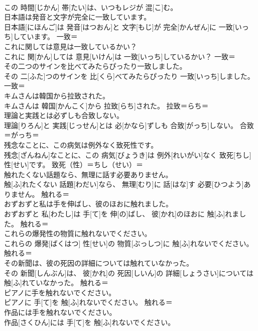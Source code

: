 \documentclass[8pt]{extreport}
\begin{document}
\begin{CJK}{UTF8}{min}
\\	この 時間[じかん] 帯[たい]は、いつもレジが 混[こ]む。	
\\	日本語は発音と文字が完全に一致しています。	
\\	日本語[にほんご]は 発音[はつおん]と 文字[もじ]が 完全[かんぜん]に 一致[いっち]しています。	一致＝ 
\\	これに関しては意見は一致しているかい？	
\\	これに 関[かん]しては 意見[いけん]は 一致[いっち]しているかい？	一致＝ 
\\	その二つのサインを比べてみたらぴったり一致しました。	
\\	その 二[ふた]つのサインを 比[くら]べてみたらぴったり 一致[いっち]しました。	一致＝ 
\\	キムさんは韓国から拉致された。	
\\	キムさんは 韓国[かんこく]から 拉致[らち]された。	拉致＝らち＝ 
\\	理論と実践とは必ずしも合致しない。	
\\	理論[りろん]と 実践[じっせん]とは 必[かなら]ずしも 合致[がっち]しない。	合致＝がっち＝ 
\\	残念なことに、この病気は例外なく致死性です。	
\\	残念[ざんねん]なことに、この 病気[びょうき]は 例外[れいがい]なく 致死[ちし] 性[せい]です。	致死（性）＝ちし（せい）＝ 
\\	触れたくない話題なら、無理に話す必要ありません。	
\\	触[ふ]れたくない 話題[わだい]なら、 無理[むり]に 話[はな]す 必要[ひつよう]ありません。	触れる＝ 
\\	おずおずと私は手を伸ばし、彼のほおに触れました。	
\\	おずおずと 私[わたし]は 手[て]を 伸[の]ばし、 彼[かれ]のほおに 触[ふ]れました。	触れる＝ 
\\	これらの爆発性の物質に触れないでください。	
\\	これらの 爆発[ばくはつ] 性[せい]の 物質[ぶっしつ]に 触[ふ]れないでください。	触れる＝ 
\\	その新聞は、彼の死因の詳細については触れていなかった。	
\\	その 新聞[しんぶん]は、 彼[かれ]の 死因[しいん]の 詳細[しょうさい]については 触[ふ]れていなかった。	触れる＝ 
\\	ピアノに手を触れないでください。	
\\	ピアノに 手[て]を 触[ふ]れないでください。	触れる＝ 
\\	作品には手を触れないでください。	
\\	作品[さくひん]には 手[て]を 触[ふ]れないでください。	

\end{CJK}
\end{document}
